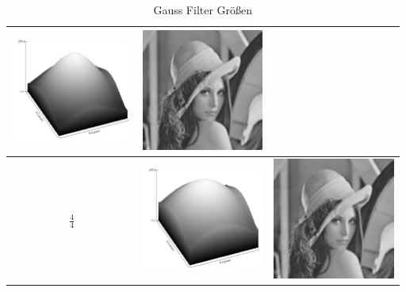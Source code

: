 \documentclass[12pt,german]{article}
\begin{document}
\begin{table}[h]
\begin{tabular}{| c | c | c |}
	\includegraphics[width=4cm]{../testData/Gauss/GaussBellR4S3.jpg} & 	\includegraphics[width=4cm]{../testData/Gauss/LenaR4S3.jpg} \\
	    \hline
    $ \frac{4}{4} $ &
	\includegraphics[width=4cm]{../testData/Gauss/GaussBellR4S4.jpg} & 	\includegraphics[width=4cm]{../testData/Gauss/LenaR4S4.jpg} \\
  \end{tabular}
  \caption{Gauss Filter Größen}
  \label{tab:GaussFilterGroessen}
\end{table}
\end{document}
